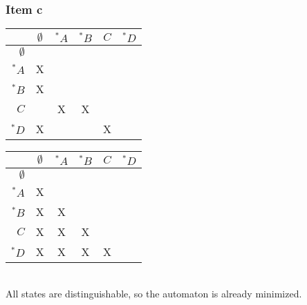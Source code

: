 \documentclass[docid=2017/18]{tcom_exam}
\begin{document}
{\begin{center}
\end{center}
\subsubsection{Item c}
\begin{minipage}[c]{0.49\textwidth}
	\begin{center}
		\begin{tabular}{r || c | c | c | c | c}
						& $\emptyset$ & $^* A$ & $^* B$ & $C$ & $^* D$ \\ \hline \hline
			$\emptyset$ & \cellcolor{gray} & \cellcolor{gray}    & \cellcolor{gray}    & \cellcolor{gray}    & \cellcolor{gray}    \\ \hline
			$     ^* A$ & X           & \cellcolor{gray}    & \cellcolor{gray}    & \cellcolor{gray}    & \cellcolor{gray}    \\ \hline
			$     ^* B$ & X           &     &  \cellcolor{gray}   & \cellcolor{gray}    & \cellcolor{gray}    \\ \hline
			$        C$ &             & X   & X   & \cellcolor{gray}    & \cellcolor{gray}    \\ \hline
			$     ^* D$ & X           &     &     & X   & \cellcolor{gray}    
		\end{tabular}
	\end{center}
\end{minipage}
\begin{minipage}[c]{0.49\textwidth}
	\begin{center}
		\begin{tabular}{r || c | c | c | c | c}
						& $\emptyset$ & $^* A$ & $^* B$ & $C$ & $^* D$ \\ \hline \hline
			$\emptyset$ & \cellcolor{gray} & \cellcolor{gray}    & \cellcolor{gray}    & \cellcolor{gray}    & \cellcolor{gray}    \\ \hline
			$     ^* A$ & X           & \cellcolor{gray}    & \cellcolor{gray}    & \cellcolor{gray}    & \cellcolor{gray}    \\ \hline
			$     ^* B$ & X           & X   &  \cellcolor{gray}   & \cellcolor{gray}    & \cellcolor{gray}    \\ \hline
			$        C$ & X           & X   & X   & \cellcolor{gray}    & \cellcolor{gray}    \\ \hline
			$     ^* D$ & X           & X   & X   & X   & \cellcolor{gray}    
		\end{tabular}
	\end{center}
\end{minipage} \vspace*{1em} \\
All states are distinguishable, so the automaton is already minimized.
\pagebreak
}
\end{document}
